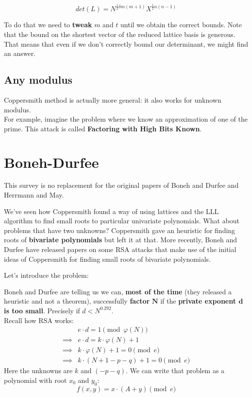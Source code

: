 \documentclass[a4paper,11pt]{article}
\begin{document}
\[ det(L) = N^{\frac{1}{2}\delta m (m+1)}X^{\frac{1}{2}n(n-1)} \]

To do that we need to \textbf{tweak} $m$ and $t$ until we obtain the correct bounds. Note that the bound on the shortest vector of the reduced lattice basis is generous. That means that even if we don't correctly bound our determinant, we might find an answer.

\subsection{Any modulus}\label{anymodulus}

Coppersmith method is actually more general: it also works for unknown modulus.\\
For example, imagine the problem where we know an approximation of one of the prime. This attack is called \textbf{Factoring with High Bits Known}.



\section{Boneh-Durfee}\label{bonehdurfee}

This survey is no replacement for the original papers of Boneh and Durfee\cite{bonehdurfee} and Herrmann and May\cite{herrmannmay}.

We've seen how Coppersmith found a way of using lattices and the LLL algorithm to find small roots to particular univariate polynomials. What about problems that have two unknowns? Coppersmith gave an heuristic for finding roots of \textbf{bivariate polynomials} but left it at that. More recently, Boneh and Durfee have released papers on some RSA attacks that make use of the initial ideas of Coppersmith for finding small roots of bivariate polynomials.

Let's introduce the problem:

Boneh and Durfee are telling us we can, \textbf{most of the time} (they released a heuristic and not a theorem), successfully \textbf{factor} $\textbf{N}$ if the \textbf{private exponent $\textbf{d}$ is too small}. Precisely if $d < N^{0.292}$.\\

Recall how RSA works:
\begin{align*}
&e \cdot d = 1 \pmod{\varphi(N)}\\
\implies& e \cdot d = k \cdot \varphi(N) + 1\\
\implies& k \cdot \varphi(N) + 1 = 0 \pmod{e}\\
\implies& k \cdot (N + 1 - p - q) + 1 = 0 \pmod{e}
\end{align*}
Here the unknowns are $k$ and $(-p-q)$. We can write that problem as a polynomial with root $x_0$ and $y_0$:
\[ f(x,y) = x \cdot (A + y) \pmod{e} \]
\end{document}
